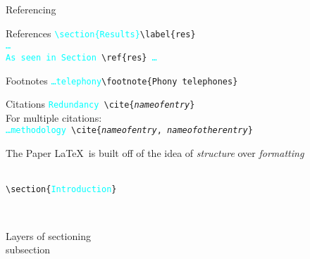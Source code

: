 
\begin{frame}{Referencing}
\begin{block}{References}
\hspace{1cm}\texttt{\textcolor{cyan}{\textbackslash section\{Results\}}\textbackslash label\{res\} \\
\hspace{1cm}\textcolor{cyan}{\ldots\\
\hspace{1cm}As seen in Section} \textbackslash ref\{res\} \textcolor{cyan}{\ldots}}
\end{block}
\begin{block}{Footnotes}
\hspace{1cm}\texttt{\textcolor{cyan}{\ldots telephony}\textbackslash footnote\{Phony telephones\}}
\end{block}
\begin{block}{Citations}
{\small\hspace{1cm}\texttt{\textcolor{cyan}{Redundancy} \textbackslash cite\{\emph{nameofentry}\}} \\
\hspace{0.5cm}For multiple citations: \\
\hspace{1cm}\texttt{\textcolor{cyan}{\ldots methodology} \textbackslash cite\{\emph{nameofentry}, \emph{nameofotherentry}\}}}
\end{block}
\end{frame}

\begin{frame}{The Paper}
\LaTeX~is built off of the idea of \emph{structure} over \emph{formatting}

~\\

\hspace{1cm}\texttt{\textbackslash section\{\textcolor{cyan}{Introduction}\}}

~\\

\begin{block}{Layers of sectioning}
\hspace{2mm}{\large section}\\
\hspace{4mm}subsection\\
\hspace{6mm}{\small subsubsection}\\
\hspace{8mm}{\footnotesize paragraph}\\
\hspace{10mm}{\scriptsize subparagraph}
\end{block}
\end{frame}


